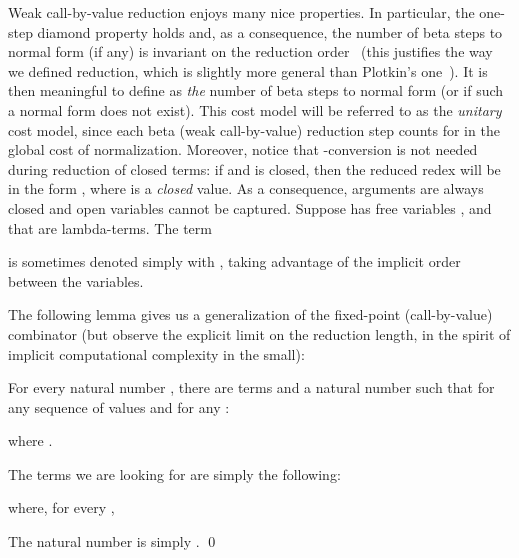 \documentclass{LMCS}
\newcounter{number}
\begin{document}
\noindent Weak call-by-value reduction enjoys many nice properties. In
particular, the one-step diamond property holds and, as a consequence,
the number of beta steps to normal form (if any) is invariant on the
reduction order~\cite{CIE2006} (this justifies the way we defined
reduction, which is slightly more general than Plotkin's
one~\cite{Plotkin75tcs}). It is then meaningful to define
 as \emph{the} number of beta steps to normal form
(or  if such a normal form does not exist). This cost model
will be referred to as the \emph{unitary} cost model, since each beta
(weak call-by-value) reduction step counts for  in the global cost
of normalization. Moreover, notice that -conversion is not
needed during reduction of closed terms: if
 and  is closed, then
the reduced redex will be in the form
, where  is a
\emph{closed} value. As a consequence, arguments are always closed and
open variables cannot be captured. Suppose  has  free
variables , and that
 are lambda-terms. The term

is sometimes denoted simply with
, taking advantage of
the implicit order between the variables.

The following lemma gives us a generalization of the fixed-point (call-by-value)
combinator (but observe the explicit limit  on the reduction length, 
in the spirit of implicit computational complexity in the small):
\begin{lem}\label{lemma:mfpc}
For every natural number , there are terms  and a natural number  such
that for any sequence of values  and for any :

where .
\end{lem}
\proof
The terms we are looking for are simply the following:

where, for every ,

The natural number  is simply .
\qed
\end{document}
